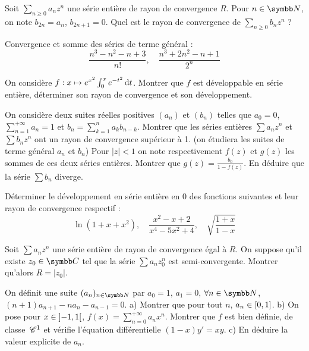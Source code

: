 \begin{exercice}
Soit $\sum_{n\ge 0}a_{n}z^{n}$ une série entière de rayon de convergence $R$. 
Pour $n\in\N$, on note $b_{2n}=a_{n}$, $b_{2n+1}=0$. 
Quel est le rayon de convergence de $\sum_{n\ge 0}b_{n}z^{n}$ ? 
\end{exercice}

\begin{exercice}
Convergence et somme des séries de terme général : 
$$ \frac{n^{3}-n^{2}-n+3}{n!}, \quad \frac{n^{3}+2n^{2}-n+1}{2^{n}} $$ 
\end{exercice}

\begin{exercice}
On considère $f:x\mapsto e^{x^{2}}\int_{0}^{x}e^{-t^{2}}\,\mathrm{d}t$. 
Montrer que $f$ est développable en série entière, déterminer son rayon de convergence et son développement. 
\end{exercice}

\begin{exercice}
On considère deux suites réelles positives $(a_{n})$ et $(b_{n})$ telles que $a_{0}=0$, $\sum_{n=1}^{+ \infty}a_{n}=1$ et $b_{n}=\sum_{k=1}^{n}a_{k}b_{n-k}$. 
Montrer que les séries entières $\sum a_{n}z^{n}$ et $\sum b_{n}z^{n}$ ont un rayon de convergence supérieur à 1. (on étudiera les suites de terme général $a_{n}$ et $b_{n}$) 
Pour $|z|<1$ on note respectivement $f(z)$ et $g(z)$ les sommes de ces deux séries entières. 
Montrer que $g(z)=\frac{b_{0}}{1-f(z)}$. 
En déduire que la série $\sum b_{n}$ diverge. 
\end{exercice}

\begin{exercice}
Déterminer le développement en série entière en 0 des fonctions suivantes et leur rayon de convergence respectif : 
$$ \ln(1+x+x^2), \quad \frac{x^2-x+2}{x^4-5x^2+4}, \quad \sqrt{\frac{1+x}{1-x}} $$ 
\end{exercice}

\begin{exercice}
Soit $\sum a_{n}z^{n}$ une série entière de rayon de convergence égal à $R$. 
On suppose qu'il existe $z_{0}\in\C$ tel que la série $\sum a_{n}z_{0}^{n}$ est semi-convergente. Montrer qu'alors $R=|z_{0}|$. 
\end{exercice}

\begin{exercice}
On définit une suite $(a_{n})_{n\in\N}$ par $a_{0}=1$, $a_{1}=0$, $\forall n\in\N$, $(n+1)a_{n+1}-na_{n}-a_{n-1}=0$. 
a) Montrer que pour tout $n$, $a_{n}\in\left[0, 1\right]$. 
b) On pose pour $x\in\left]-1, 1\right[$, $f(x)=\sum_{n=0}^{+ \infty}a_{n}x^{n}$. 
Montrer que $f$ est bien définie, de classe $\,\mathscr C^{1}$ et vérifie l'équation différentielle $(1-x)y'=xy$. 
c) En déduire la valeur explicite de $a_{n}$. 
\end{exercice}

